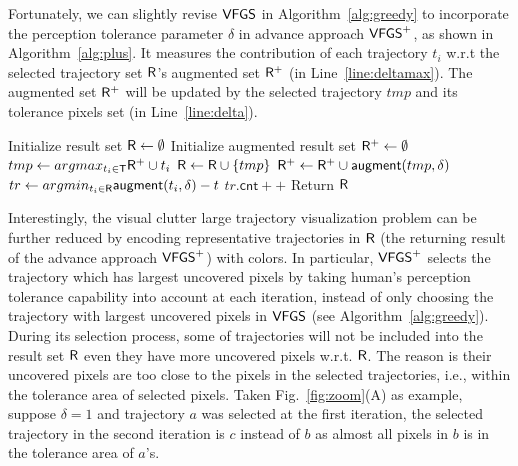 Fortunately, we can slightly revise $\mathsf{VFGS}$ in Algorithm~\ref{alg:greedy} to incorporate the perception tolerance parameter $\delta$ in advance approach $\mathsf{VFGS}^{+}$, as shown in Algorithm~\ref{alg:plus}.
It measures the contribution of each trajectory $t_i$ w.r.t the selected trajectory set $\mathsf{R}$'s augmented set $\mathsf{R}^{+}$ (in Line~\ref{line:deltamax}).
The augmented set $\mathsf{R}^{+}$ will be updated by the selected trajectory $tmp$ and its tolerance pixels set (in Line~\ref{line:delta}).

\vspace{-2mm}
\begin{algorithm}
    \caption{$\avats(\D,k=\alpha |\D|,\delta)$} \label{alg:plus}
    \begin{algorithmic}[1]
    \State Initialize result set $\mathsf{R} \leftarrow \emptyset$
    \State Initialize augmented result set $\mathsf{R}^{+} \leftarrow \emptyset$
        \State $tmp \leftarrow argmax_{t_i \in \mathsf{T}} \mathsf{R}^{+} \cup t_i$ \label{line:deltamax}
        \State $\mathsf{R} \leftarrow \mathsf{R} \cup \{ tmp \}$
        \State $\mathsf{R}^{+} \leftarrow \mathsf{R}^{+} \cup \mathsf{augment}(tmp, \delta)$\label{line:delta}
    \EndWhile
      \label{line:s}
        \State $tr \leftarrow argmin_{t_i \in \mathsf{R}}{\mathsf{augment}(t_i, \delta) - t}$
        \State $tr.\mathsf{cnt}++$ \label{line:e}
    \EndFor
    \State Return $\mathsf{R}$
    \end{algorithmic}
\end{algorithm}
\vspace{-2mm}

Interestingly, the visual clutter large trajectory visualization problem can be further reduced
by encoding representative trajectories in $\mathsf{R}$ (the returning result of the advance approach $\mathsf{VFGS}^{+}$) with colors.
In particular, $\mathsf{VFGS}^{+}$ selects the trajectory which has largest uncovered pixels by taking human's perception tolerance capability into account at each iteration,
instead of only choosing the trajectory with largest uncovered pixels in $\mathsf{VFGS}$ (see Algorithm~\ref{alg:greedy}).
During its selection process, some of trajectories will not be included into the result set $\mathsf{R}$ even they have more uncovered pixels w.r.t. $\mathsf{R}$.
The reason is their uncovered pixels are too close to the pixels in the selected trajectories, i.e., within the tolerance area of selected pixels.
Taken Fig.~\ref{fig:zoom}(A) as example, suppose $\delta=1$ and trajectory $a$ was selected at the first iteration,
the selected trajectory in the second iteration is $c$ instead of $b$ as almost all pixels in $b$ is in the tolerance area of $a$'s.

